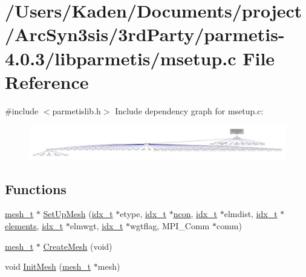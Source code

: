 \hypertarget{a00380}{}\section{/\+Users/\+Kaden/\+Documents/project/\+Arc\+Syn3sis/3rd\+Party/parmetis-\/4.0.3/libparmetis/msetup.c File Reference}
\label{a00380}
{\ttfamily \#include $<$parmetislib.\+h$>$}\newline
Include dependency graph for msetup.\+c\+:\nopagebreak
\begin{figure}[H]
\begin{center}
\leavevmode
\includegraphics[width=350pt]{a00381}
\end{center}
\end{figure}
\subsection*{Functions}
\begin{DoxyCompactItemize}
\item 
\hyperlink{a00738}{mesh\+\_\+t} $\ast$ \hyperlink{a00380_a9f9b575b1270719a1d7ae34f89ed2dc5}{Set\+Up\+Mesh} (\hyperlink{a00876_aaa5262be3e700770163401acb0150f52}{idx\+\_\+t} $\ast$etype, \hyperlink{a00876_aaa5262be3e700770163401acb0150f52}{idx\+\_\+t} $\ast$\hyperlink{a00879_ac1dd31740e8f97fb57dc917ded30253f}{ncon}, \hyperlink{a00876_aaa5262be3e700770163401acb0150f52}{idx\+\_\+t} $\ast$elmdist, \hyperlink{a00876_aaa5262be3e700770163401acb0150f52}{idx\+\_\+t} $\ast$\hyperlink{a00617_aa9aaa650bacb9b91c82437c2ce48f50c}{elements}, \hyperlink{a00876_aaa5262be3e700770163401acb0150f52}{idx\+\_\+t} $\ast$elmwgt, \hyperlink{a00876_aaa5262be3e700770163401acb0150f52}{idx\+\_\+t} $\ast$wgtflag, M\+P\+I\+\_\+\+Comm $\ast$comm)
\item 
\hyperlink{a00738}{mesh\+\_\+t} $\ast$ \hyperlink{a00380_aec1a4bd83e832be7befbf6b03e9513ad}{Create\+Mesh} (void)
\item 
void \hyperlink{a00380_a82cd62ea70eaae4395fee538d40cf12b}{Init\+Mesh} (\hyperlink{a00738}{mesh\+\_\+t} $\ast$mesh)
\end{DoxyCompactItemize}



